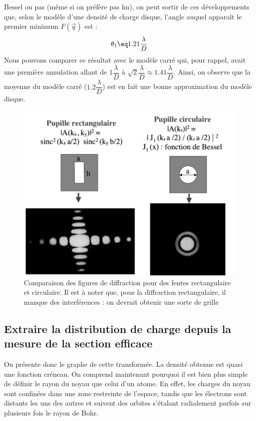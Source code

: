 Bessel ou pas (même si on préfère pas hn), on peut sortir de ces développements que, selon le modèle d'une densité de charge disque, l'angle auquel apparaît le premier minimum $F(\vec{q})$ est :
\begin{equation*}
    \theta_1 \eq 1.21\dfrac{\lambda}{D}
\end{equation*}
Nous pouvons comparer ce résultat avec le modèle carré qui, pour rappel, avait une première annulation allant de $1\dfrac{\lambda}{D}$ à $\sqrt{2}\dfrac{\lambda}{D}\approx 1.41\dfrac{\lambda}{D}$. Ainsi, on observe que la moyenne du modèle carré ($1.2\dfrac{\lambda}{D}$) est en fait une bonne approximation du modèle disque.
\begin{figure}[H]
    \centering
    \includegraphics[scale=0.6]{Images4/ComparaisonFente.PNG}
    \caption{Comparaison des figures de diffraction pour des fentes rectangulaire et circulaire. Il est à noter que, pour la diffraction rectangulaire, il manque des interférences : on devrait obtenir une sorte de grille}
    \label{fig:Comparaison fente}
\end{figure}





\subsection{Extraire la distribution de charge depuis la mesure de la section efficace}




On présente donc le graphe de cette transformée. La densité obtenue est quasi une fonction créneau. On comprend maintenant pourquoi il est bien plus simple de définir le rayon du noyau que celui d'un atome. En effet, les charges du noyau sont confinées dans une zone restreinte de l'espace, tandis que les électrons sont distants les uns des autres et suivent des orbites s'étalant radialement parfois sur plusieurs fois le rayon de Bohr.




